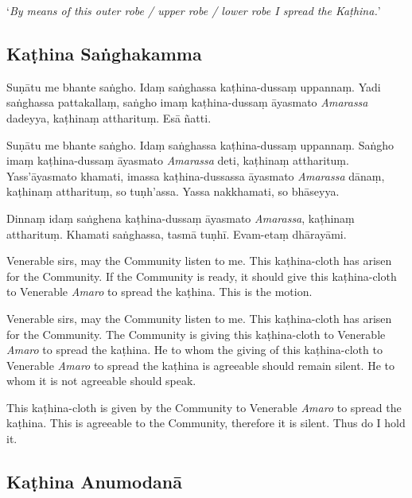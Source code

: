 ‘\emph{By means of this outer robe / upper robe / lower robe I spread the Kaṭhina.}’


\clearpage

\subsection{Kaṭhina Saṅghakamma}


Suṇātu me bhante saṅgho. Idaṃ saṅghassa kaṭhina-dussaṃ uppannaṃ. Yadi saṅghassa
pattakallaṃ, saṅgho imaṃ kaṭhina-dussaṃ āyasmato \emph{Amarassa} dadeyya,
kaṭhinaṃ attharituṃ. Esā ñatti.

Suṇātu me bhante saṅgho. Idaṃ saṅghassa kaṭhina-dussaṃ uppannaṃ. Saṅgho imaṃ
kaṭhina-dussaṃ āyasmato \emph{Amarassa} deti, kaṭhinaṃ attharituṃ.
Yass'āyasmato khamati, imassa kaṭhina-dussassa āyasmato \emph{Amarassa} dānaṃ,
kaṭhinaṃ attharituṃ, so tuṇh'assa. Yassa nakkhamati, so bhāseyya.

Dinnaṃ idaṃ saṅghena kaṭhina-dussaṃ āyasmato \emph{Amarassa}, kaṭhinaṃ
attharituṃ. Khamati saṅghassa, tasmā tuṇhī. Evam-etaṃ dhārayāmi.


\begin{english}

Venerable sirs, may the Community listen to me. This kaṭhina-cloth has arisen
for the Community. If the Community is ready, it should give this kaṭhina-cloth
to Venerable \emph{Amaro} to spread the kaṭhina. This is the motion.

Venerable sirs, may the Community listen to me. This kaṭhina-cloth has arisen
for the Community. The Community is giving this kaṭhina-cloth to Venerable
\emph{Amaro} to spread the kaṭhina. He to whom the giving of this kaṭhina-cloth
to Venerable \emph{Amaro} to spread the kaṭhina is agreeable should remain
silent. He to whom it is not agreeable should speak.

This kaṭhina-cloth is given by the Community to Venerable \emph{Amaro} to
spread the kaṭhina. This is agreeable to the Community, therefore it is silent.
Thus do I hold it.

\end{english}

\subsection{Kaṭhina Anumodanā}

